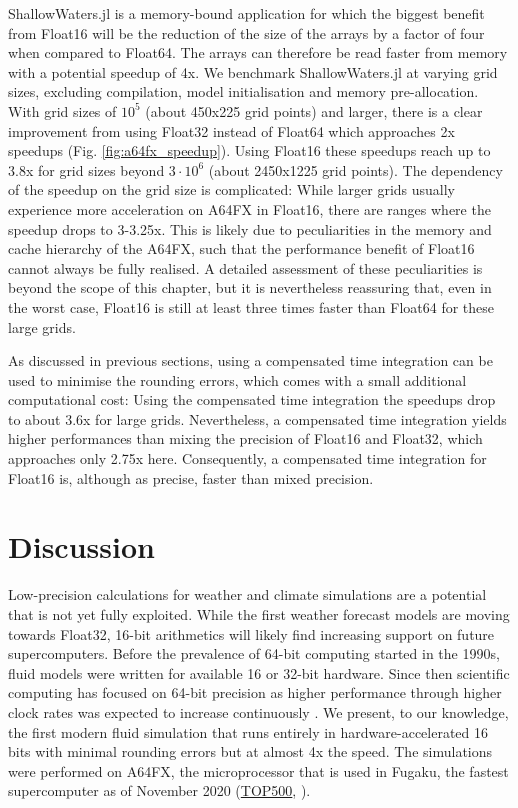 ShallowWaters.jl is a memory-bound application for which the biggest benefit from Float16 will be the reduction of
the size of the arrays by a factor of four when compared to Float64. The arrays can therefore be read faster from
memory with a potential speedup of 4x. We benchmark ShallowWaters.jl at varying grid sizes, excluding compilation,
model initialisation and memory pre-allocation. With grid sizes of $10^5$ (about 450x225 grid points) and larger,
there is a clear improvement from using Float32 instead of Float64 which approaches 2x speedups (Fig.
\ref{fig:a64fx_speedup}). Using Float16 these speedups reach up to 3.8x for grid sizes beyond $3 \cdot 10^6$
(about 2450x1225 grid points). The dependency of the speedup on the grid size is complicated:
While larger grids usually experience more acceleration on A64FX in Float16, there are ranges where the speedup
drops to 3-3.25x. This is likely due to peculiarities in the memory and cache hierarchy of the
A64FX, such that the performance benefit of Float16 cannot always be fully realised. A detailed assessment of these
peculiarities is beyond the scope of this chapter, but it is nevertheless reassuring that, even in the worst case, Float16
is still at least three times faster than Float64 for these large grids. 

As discussed in previous sections, using a compensated time integration can be used to minimise the rounding errors,
which comes with a small additional computational cost: Using the compensated time integration the speedups drop to
about 3.6x for large grids. Nevertheless, a compensated time integration yields higher performances than mixing the
precision of Float16 and Float32, which approaches only 2.75x here. Consequently, a compensated time integration
for Float16 is, although as precise, faster than mixed precision.

\section{Discussion}
\label{sec:hardware_discussion}

Low-precision calculations for weather and climate simulations are a potential that is not yet fully exploited.
While the first weather forecast models are moving towards Float32, 16-bit arithmetics will likely find increasing
support on future supercomputers. Before the prevalence of 64-bit computing started in the 1990s, fluid models
were written for available 16 or 32-bit hardware. Since then scientific computing has focused on 64-bit precision
as higher performance through higher clock rates was expected to increase continuously \citep{Moore1998}.
We present, to our knowledge, the first modern fluid simulation that runs entirely in hardware-accelerated 16 bits
with minimal rounding errors but at almost 4x the speed. The simulations were performed on A64FX, the microprocessor
that is used in Fugaku, the fastest supercomputer as of November 2020 (\href{https://top500.org}{TOP500}, \cite{Dongarra2011}).

